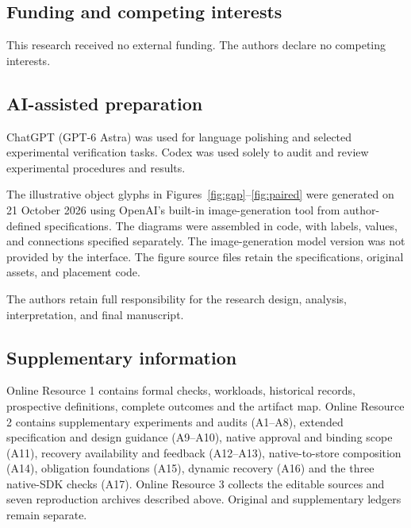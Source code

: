 \documentclass[pdflatex,sn-basic]{sn-jnl}
\begin{document}
\subsection*{Funding and competing interests}
This research received no external funding. The authors declare no competing interests.

\subsection*{AI-assisted preparation}
ChatGPT (GPT-6 Astra) was used for language polishing and selected experimental verification tasks. Codex was used solely to audit and review experimental procedures and results.

The illustrative object glyphs in Figures~\ref{fig:gap}--\ref{fig:paired} were generated on 21 October 2026 using OpenAI's built-in image-generation tool from author-defined specifications. The diagrams were assembled in code, with labels, values, and connections specified separately. The image-generation model version was not provided by the interface. The figure source files retain the specifications, original assets, and placement code.

The authors retain full responsibility for the research design, analysis, interpretation, and final manuscript.

\subsection*{Supplementary information}
Online Resource 1 contains formal checks, workloads, historical records, prospective definitions, complete outcomes and the artifact map. Online Resource 2 contains supplementary experiments and audits (A1--A8), extended specification and design guidance (A9--A10), native approval and binding scope (A11), recovery availability and feedback (A12--A13), native-to-store composition (A14), obligation foundations (A15), dynamic recovery (A16) and the three native-SDK checks (A17). Online Resource 3 collects the editable sources and seven reproduction archives described above. Original and supplementary ledgers remain separate.

\setlength{\bibsep}{0.5em}

\end{document}
